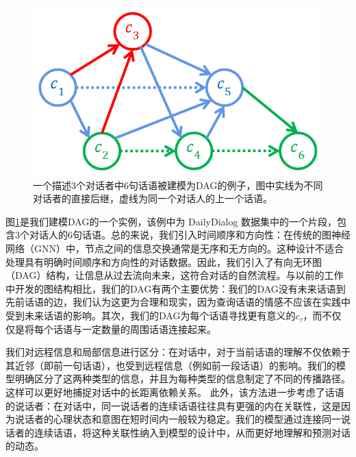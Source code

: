 \begin{figure}[h]
	\centering
    \includegraphics[width=0.5\linewidth]{figures/dag.png}
        \vspace{8pt}
	\caption{一个描述3个对话者中6句话语被建模为DAG的例子，图中实线为不同对话者的直接后继，虚线为同一个对话人的上一个话语。}
    \label{fig:dag}
    \vspace{10pt}
\end{figure}


图\ref{fig:dag}是我们建模DAG的一个实例，该例中为 DailyDialog 数据集中的一个片段，包含3个对话人的6句话语。总的来说，我们引入时间顺序和方向性：在传统的图神经网络（GNN）中，节点之间的信息交换通常是无序和无方向的。这种设计不适合处理具有明确时间顺序和方向性的对话数据。因此，我们引入了有向无环图（DAG）结构，让信息从过去流向未来，这符合对话的自然流程。与以前的工作\cite{ghosal2019dialoguegcn,ishiwatari2020relation}中开发的图结构相比，我们的DAG有两个主要优势：我们的DAG没有未来话语到先前话语的边，我们认为这更为合理和现实，因为查询话语的情感不应该在实践中受到未来话语的影响。其次，我们的DAG为每个话语寻找更有意义的$c_\tau$，而不仅仅是将每个话语与一定数量的周围话语连接起来。

我们对远程信息和局部信息进行区分：在对话中，对于当前话语的理解不仅依赖于其近邻（即前一句话语），也受到远程信息（例如前一段话语）的影响。我们的模型明确区分了这两种类型的信息，并且为每种类型的信息制定了不同的传播路径。这样可以更好地捕捉对话中的长距离依赖关系。
此外，该方法进一步考虑了话语的说话者：在对话中，同一说话者的连续话语往往具有更强的内在关联性，这是因为说话者的心理状态和意图在短时间内一般较为稳定。我们的模型通过连接同一说话者的连续话语，将这种关联性纳入到模型的设计中，从而更好地理解和预测对话的动态。


